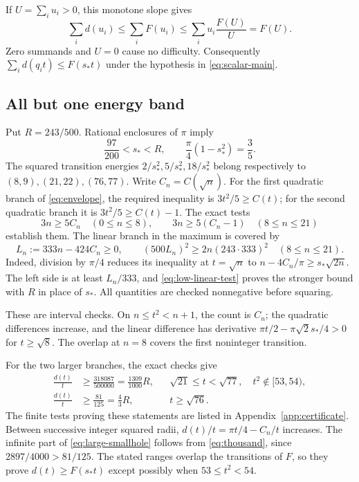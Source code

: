 \documentclass[11pt,reqno]{amsart}
\numberwithin{equation}{section}
\newcommand{\sstar}{s_*}
\begin{document}
If $U=\sum_i u_i>0$, this monotone slope gives
\begin{equation}\label{eq:aggregate-envelope}
 \sum_i d(u_i)\le\sum_iF(u_i)
 \le\sum_i u_i\frac{F(U)}U=F(U).
\end{equation}
Zero summands and $U=0$ cause no difficulty. Consequently
$\sum_i d(q_it)\le F(\sstar t)$ under the hypothesis in
\eqref{eq:scalar-main}.

\subsection*{All but one energy band}

Put $R=243/500$. Rational enclosures of $\pi$ imply
\begin{equation}\label{eq:sstar-bracket}
 \frac{97}{200}<\sstar<R,
 \qquad \frac\pi4(1-\sstar^2)=\frac35.
\end{equation}
The squared transition energies
$2/\sstar^2,5/\sstar^2,18/\sstar^2$ belong respectively to
$(8,9),(21,22),(76,77)$. Write $C_n=C(\sqrt n)$.
For the first quadratic branch of \eqref{eq:envelope}, the
required inequality is $3t^2/5\ge C(t)$; for the second
quadratic branch it is $3t^2/5\ge C(t)-1$. The exact tests
\begin{equation}\label{eq:low-tests}
 3n\ge5C_n\quad(0\le n\le8),\qquad
 3n\ge5(C_n-1)\quad(8\le n\le21)
\end{equation}
establish them. The linear branch in the maximum is covered by
\begin{equation}\label{eq:low-linear-test}
 L_n:=333n-424C_n\ge0,
 \qquad(500L_n)^2\ge2n(243\cdot333)^2
 \quad(8\le n\le21).
\end{equation}
Indeed, division by $\pi/4$ reduces its inequality at $t=\sqrt n$
to $n-4C_n/\pi\ge\sstar\sqrt{2n}$. The left side is at
least $L_n/333$, and \eqref{eq:low-linear-test} proves the
stronger bound with $R$ in place of $\sstar$. All quantities
are checked nonnegative before squaring.

These are interval checks. On $n\le t^2<n+1$, the count is
$C_n$; the quadratic differences increase, and the linear
difference has derivative $\pi t/2-\pi\sqrt2\sstar/4>0$
for $t\ge\sqrt8$. The overlap at $n=8$ covers the first
noninteger transition.

For the two larger branches, the exact checks give
\begin{align}
 \frac{d(t)}t&\ge\frac{318087}{500000}
       =\frac{1309}{1000}R,
 &&\sqrt{21}\le t<\sqrt{77},\quad t^2\notin[53,54),
 \label{eq:middle-smallhole}\\
 \frac{d(t)}t&\ge\frac{81}{125}=\frac43R,
 &&t\ge\sqrt{76}.\label{eq:large-smallhole}
\end{align}
The finite tests proving these statements are listed in
Appendix~\ref{app:certificate}. Between successive integer
squared radii, $d(t)/t=\pi t/4-C_n/t$ increases. The infinite
part of \eqref{eq:large-smallhole} follows from
\eqref{eq:thousand}, since $2897/4000>81/125$.
The stated ranges overlap the transitions of $F$, so they
prove $d(t)\ge F(\sstar t)$ except possibly when
$53\le t^2<54$.
\end{document}
